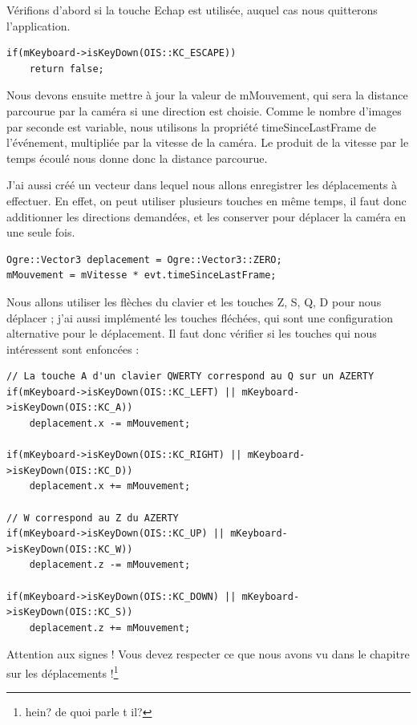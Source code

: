 \documentclass[10pt,a4paper]{report}
\begin{document}
V\'erifions d'abord si la touche Echap est utilis\'ee, auquel cas nous quitterons l'application.


\begin{lstlisting}[caption={}]
if(mKeyboard->isKeyDown(OIS::KC_ESCAPE))
    return false;
\end{lstlisting}

Nous devons ensuite mettre \`a jour la valeur de mMouvement, qui sera la distance parcourue par la cam\'era si une direction est choisie. Comme le nombre d'images par seconde est variable, nous utilisons la propri\'et\'e timeSinceLastFrame de l'\'ev\'enement, multipli\'ee par la vitesse de la cam\'era. Le produit de la vitesse par le temps \'ecoul\'e nous donne donc la distance parcourue.

J'ai aussi cr\'e\'e un vecteur dans lequel nous allons enregistrer les d\'eplacements \`a effectuer. En effet, on peut utiliser plusieurs touches en m\^eme temps, il faut donc additionner les directions demand\'ees, et les conserver pour d\'eplacer la cam\'era en une seule fois.


\begin{lstlisting}[caption={}]
Ogre::Vector3 deplacement = Ogre::Vector3::ZERO;
mMouvement = mVitesse * evt.timeSinceLastFrame;
\end{lstlisting}

Nous allons utiliser les fl\`eches du clavier et les touches Z, S, Q, D pour nous d\'eplacer ; j'ai aussi impl\'ement\'e les touches fl\'ech\'ees, qui sont une configuration alternative pour le d\'eplacement. Il faut donc v\'erifier si les touches qui nous int\'eressent sont enfonc\'ees :


\begin{lstlisting}[caption={}]
// La touche A d'un clavier QWERTY correspond au Q sur un AZERTY
if(mKeyboard->isKeyDown(OIS::KC_LEFT) || mKeyboard->isKeyDown(OIS::KC_A)) 
    deplacement.x -= mMouvement;

if(mKeyboard->isKeyDown(OIS::KC_RIGHT) || mKeyboard->isKeyDown(OIS::KC_D))
    deplacement.x += mMouvement;
    
// W correspond au Z du AZERTY
if(mKeyboard->isKeyDown(OIS::KC_UP) || mKeyboard->isKeyDown(OIS::KC_W)) 
    deplacement.z -= mMouvement;

if(mKeyboard->isKeyDown(OIS::KC_DOWN) || mKeyboard->isKeyDown(OIS::KC_S))
    deplacement.z += mMouvement;
\end{lstlisting}

Attention aux signes ! Vous devez respecter ce que nous avons vu dans le chapitre sur les d\'eplacements !\footnote{hein? de quoi parle t il?}
\end{document}
